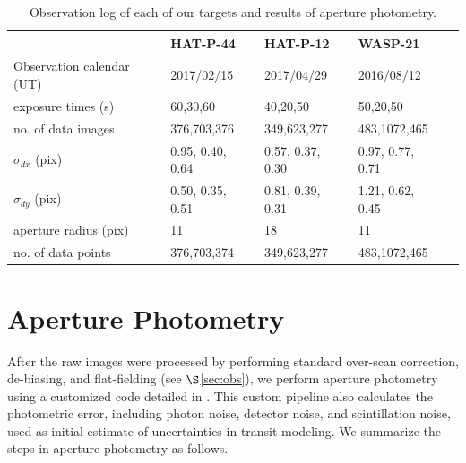 \begin{table}
\centering
\caption{Observation log of each of our targets and results of aperture photometry.}
\label{tab:obs}
\begin{tabular}{lllll} \hline
                                       &HAT-P-44      &HAT-P-12        &WASP-21       \\ \hline
Observation calendar (UT)    & 2017/02/15  & 2017/04/29  & 2016/08/12\\
exposure times (s) &60,30,60 & 40,20,50 & 50,20,50 \\
no. of data images & 376,703,376 & 349,623,277 & 483,1072,465 \\
$\sigma_{dx}$ (pix)& 0.95, 0.40, 0.64& 0.57, 0.37, 0.30 & 0.97, 0.77, 0.71 \\
$\sigma_{dy}$ (pix)& 0.50, 0.35, 0.51& 0.81, 0.39, 0.31 & 1.21, 0.62, 0.45 \\ \hline
aperture radius (pix) & 11 & 18 & 11 \\
no. of data points & 376,703,374 & 349,623,277 & 483,1072,465 \\
\hline
\end{tabular}
\end{table}


\section{Aperture Photometry}\label{sec:apphot}
After the raw images were processed by performing standard over-scan correction, de-biasing, and flat-fielding (see $\S$\ref{sec:obs}), we perform aperture photometry using a customized code detailed in \cite{Fukui2011}. This custom pipeline also calculates the photometric error, including photon noise, detector noise, and scintillation noise, used as initial estimate of uncertainties in transit modeling. We summarize the steps in aperture photometry as follows.

